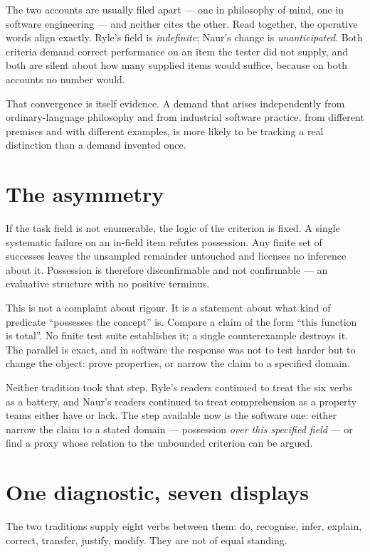 \documentclass[11pt,a4paper]{article}
\begin{document}
The two accounts are usually filed apart --- one in philosophy of mind, one in software engineering --- and neither cites the other. Read together, the operative words align exactly. Ryle's field is \emph{indefinite}; Naur's change is \emph{unanticipated}. Both criteria demand correct performance on an item the tester did not supply, and both are silent about how many supplied items would suffice, because on both accounts no number would.

That convergence is itself evidence. A demand that arises independently from ordinary-language philosophy and from industrial software practice, from different premises and with different examples, is more likely to be tracking a real distinction than a demand invented once.

\section{The asymmetry}
If the task field is not enumerable, the logic of the criterion is fixed. A single systematic failure on an in-field item refutes possession. Any finite set of successes leaves the unsampled remainder untouched and licenses no inference about it. Possession is therefore disconfirmable and not confirmable --- an evaluative structure with no positive terminus.

This is not a complaint about rigour. It is a statement about what kind of predicate ``possesses the concept'' is. Compare a claim of the form ``this function is total''. No finite test suite establishes it; a single counterexample destroys it. The parallel is exact, and in software the response was not to test harder but to change the object: prove properties, or narrow the claim to a specified domain.

Neither tradition took that step. Ryle's readers continued to treat the six verbs as a battery, and Naur's readers continued to treat comprehension as a property teams either have or lack. The step available now is the software one: either narrow the claim to a stated domain --- possession \emph{over this specified field} --- or find a proxy whose relation to the unbounded criterion can be argued.

\section{One diagnostic, seven displays}
The two traditions supply eight verbs between them: do, recognise, infer, explain, correct, transfer, justify, modify. They are not of equal standing.
\end{document}
